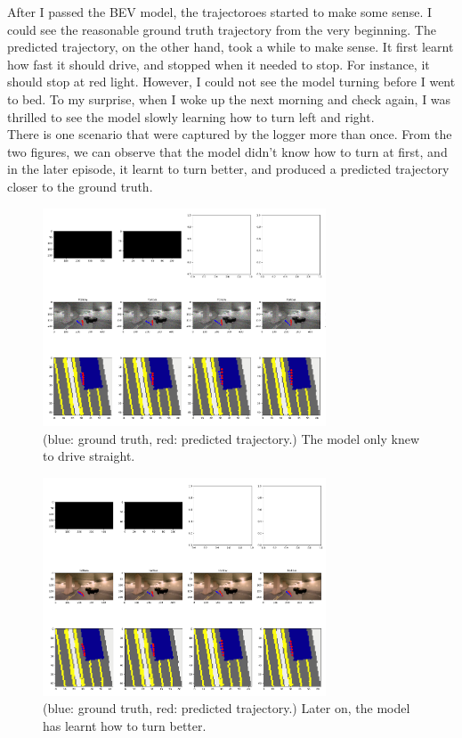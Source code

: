 \documentclass[inputenc=utf8]{ldvarticle}
\begin{document}
\noindent After I passed the BEV model, the trajectoroes started to make some sense. I could see the reasonable ground truth trajectory from the very beginning. The predicted trajectory, on the other hand, took a while to make sense. It first learnt how fast it should drive, and stopped when it needed to stop. For instance, it should stop at red light. However, I could not see the model turning before I went to bed. To my surprise, when I woke up the next morning and check again, I was thrilled to see the model slowly learning how to turn left and right. 
\\

\noindent There is one scenario that were captured by the logger more than once. From the two figures, we can observe that the model didn’t know how to turn at first, and in the later episode, it learnt to turn better, and produced a predicted trajectory closer to the ground truth.
\begin{figure}[H]
  \centering
  \includegraphics[width=0.75\textwidth] {bilder/lace_thunder_27.png} 
  \caption{(blue: ground truth, red: predicted trajectory.) The model only knew to drive straight. }
\end{figure}

\begin{figure}[H]
  \centering
  \includegraphics[width=0.75\textwidth] {bilder/lace_thunder_120.png} 
  \caption{(blue: ground truth, red: predicted trajectory.) Later on, the model has learnt how to turn better.}
\end{figure}
\end{document}
